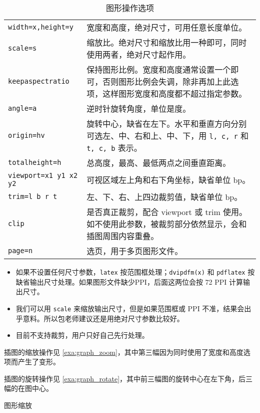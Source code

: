 \begin{table}[htbp]
\caption{图形操作选项}
\label{tab:graph_options}
\centering
\begin{tabularx}{\textwidth}{lX}
  \toprule
  \texttt{width=x,height=y} & 宽度和高度，绝对尺寸，可用任意长度单位。\\
  \texttt{scale=s} & 缩放比。绝对尺寸和缩放比用一种即可，同时使用两者，绝对尺寸起作用。\\
  \texttt{keepaspectratio} & 保持图形比例。宽度和高度通常设置一个即可，否则图形比例会失调，除非再加上此选项，这样图形宽度和高度都不超过指定参数。\\
  \texttt{angle=a} & 逆时针旋转角度，单位是度。\\
  \texttt{origin=hv} & 旋转中心，缺省在左下。水平和垂直方向分别可选左、中、右和上、中、下，用 \texttt{l, c, r} 和 \texttt{t, c, b} 表示。\\
  \texttt{totalheight=h} & 总高度，最高、最低两点之间垂直距离。\\
  \texttt{viewport=x1 y1 x2 y2} & 可视区域左上角和右下角坐标，缺省单位 bp。\\
  \texttt{trim=l b r t} & 左、下、右、上四边裁剪值，缺省单位 bp。\\
  \texttt{clip} & 是否真正裁剪，配合 viewport 或 trim 使用。如不使用此参数，被裁剪部分依然显示，会和插图周围内容重叠。\\
  \texttt{page=n} & 选页，用于多页图形文件。\\
  \bottomrule
\end{tabularx}
\end{table}

\begin{itemize}
  \item 如果不设置任何尺寸参数，\texttt{latex} 按范围框处理；\texttt{dvipdfm(x)} 和 \texttt{pdflatex} 按缺省输出尺寸处理。如果图形文件缺少PPI，后面这两位会按 72 PPI 计算输出尺寸。
  \item 我们可以用 \texttt{scale} 来缩放输出尺寸，但是如果范围框或 PPI 不准，结果会出乎意料。所以包老师建议还是用绝对尺寸参数比较好。
  \item \XeTeX 目前不支持裁剪，用户只好自己先行处理。
\end{itemize}
  
插图的缩放操作见 \autoref{exa:graph_zoom}，其中第三幅因为同时使用了宽度和高度选项而产生了变形。

插图的旋转操作见 \autoref{exa:graph_rotate}，其中前三幅图的旋转中心在左下角，后三幅的在图中心。

\begin{example}[htbp]
\caption{图形缩放}
\label{exa:graph_zoom}
\end{example}

